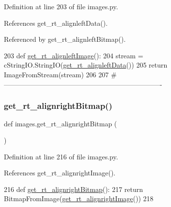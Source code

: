 Definition at line 203 of file images.\+py.



References get\+\_\+rt\+\_\+alignleft\+Data().



Referenced by get\+\_\+rt\+\_\+alignleft\+Bitmap().


\begin{DoxyCode}
203 \textcolor{keyword}{def }\hyperlink{namespaceimages_ac5bb51ed178a2b8654577b5a450c2a95}{get\_rt\_alignleftImage}():
204     stream = cStringIO.StringIO(\hyperlink{namespaceimages_aca3df35d167083df9d30d2d01cb284d9}{get\_rt\_alignleftData}())
205     \textcolor{keywordflow}{return} ImageFromStream(stream)
206 
207 \textcolor{comment}{#----------------------------------------------------------------------}
\end{DoxyCode}
\mbox{\label{namespaceimages_a36985a57da68387cd9ab178b51b2a516}} 
\subsubsection{\texorpdfstring{get\+\_\+rt\+\_\+alignright\+Bitmap()}{get\_rt\_alignrightBitmap()}}
{\footnotesize\ttfamily def images.\+get\+\_\+rt\+\_\+alignright\+Bitmap (\begin{DoxyParamCaption}{ }\end{DoxyParamCaption})}



Definition at line 216 of file images.\+py.



References get\+\_\+rt\+\_\+alignright\+Image().


\begin{DoxyCode}
216 \textcolor{keyword}{def }\hyperlink{namespaceimages_a36985a57da68387cd9ab178b51b2a516}{get\_rt\_alignrightBitmap}():
217     \textcolor{keywordflow}{return} BitmapFromImage(\hyperlink{namespaceimages_a30f98db321746be49e7494a4468df4ea}{get\_rt\_alignrightImage}())
218 
\end{DoxyCode}
\mbox{\label{namespaceimages_acf000e07da367236ad5320674525c7a5}} 
